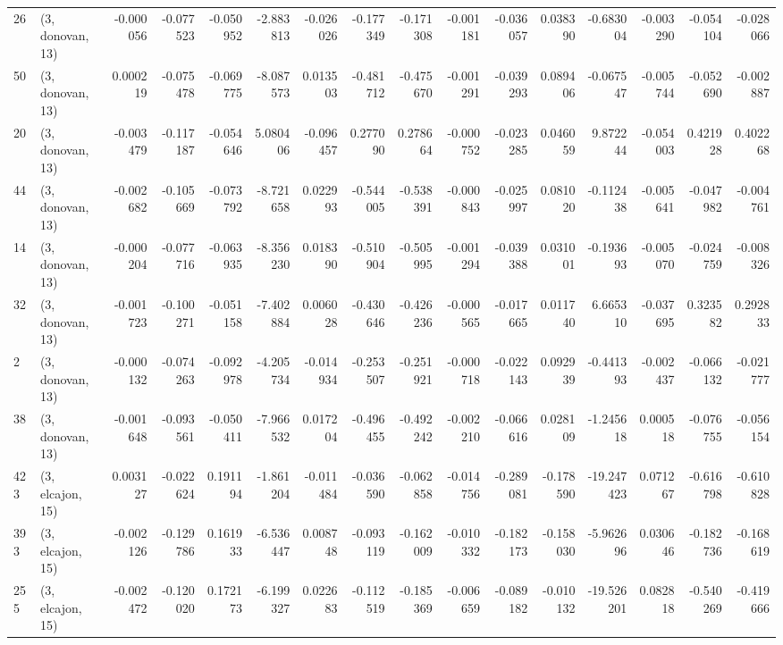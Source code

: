 \begin{tabular}{llrrrrrrrrrrrrrr}
26  &  (3, donovan, 13) &  -0.000056 & -0.077523 & -0.050952 &  -2.883813 & -0.026026 &  -0.177349 & -0.171308 & -0.001181 & -0.036057 &  0.038390 &    -0.683004 &  -0.003290 &  -0.054104 &  -0.028066 \\
50  &  (3, donovan, 13) &   0.000219 & -0.075478 & -0.069775 &  -8.087573 &  0.013503 &  -0.481712 & -0.475670 & -0.001291 & -0.039293 &  0.089406 &    -0.067547 &  -0.005744 &  -0.052690 &  -0.002887 \\
20  &  (3, donovan, 13) &  -0.003479 & -0.117187 & -0.054646 &   5.080406 & -0.096457 &   0.277090 &  0.278664 & -0.000752 & -0.023285 &  0.046059 &     9.872244 &  -0.054003 &   0.421928 &   0.402268 \\
44  &  (3, donovan, 13) &  -0.002682 & -0.105669 & -0.073792 &  -8.721658 &  0.022993 &  -0.544005 & -0.538391 & -0.000843 & -0.025997 &  0.081020 &    -0.112438 &  -0.005641 &  -0.047982 &  -0.004761 \\
14  &  (3, donovan, 13) &  -0.000204 & -0.077716 & -0.063935 &  -8.356230 &  0.018390 &  -0.510904 & -0.505995 & -0.001294 & -0.039388 &  0.031001 &    -0.193693 &  -0.005070 &  -0.024759 &  -0.008326 \\
32  &  (3, donovan, 13) &  -0.001723 & -0.100271 & -0.051158 &  -7.402884 &  0.006028 &  -0.430646 & -0.426236 & -0.000565 & -0.017665 &  0.011740 &     6.665310 &  -0.037695 &   0.323582 &   0.292833 \\
2   &  (3, donovan, 13) &  -0.000132 & -0.074263 & -0.092978 &  -4.205734 & -0.014934 &  -0.253507 & -0.251921 & -0.000718 & -0.022143 &  0.092939 &    -0.441393 &  -0.002437 &  -0.066132 &  -0.021777 \\
38  &  (3, donovan, 13) &  -0.001648 & -0.093561 & -0.050411 &  -7.966532 &  0.017204 &  -0.496455 & -0.492242 & -0.002210 & -0.066616 &  0.028109 &    -1.245618 &   0.000518 &  -0.076755 &  -0.056154 \\
423 &  (3, elcajon, 15) &   0.003127 & -0.022624 &  0.191194 &  -1.861204 & -0.011484 &  -0.036590 & -0.062858 & -0.014756 & -0.289081 & -0.178590 &   -19.247423 &   0.071267 &  -0.616798 &  -0.610828 \\
393 &  (3, elcajon, 15) &  -0.002126 & -0.129786 &  0.161933 &  -6.536447 &  0.008748 &  -0.093119 & -0.162009 & -0.010332 & -0.182173 & -0.158030 &    -5.962696 &   0.030646 &  -0.182736 &  -0.168619 \\
255 &  (3, elcajon, 15) &  -0.002472 & -0.120020 &  0.172173 &  -6.199327 &  0.022683 &  -0.112519 & -0.185369 & -0.006659 & -0.089182 & -0.010132 &   -19.526201 &   0.082818 &  -0.540269 &  -0.419666 \\

\end{tabular}
